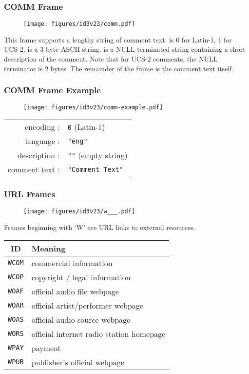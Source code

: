 \clearpage

\subsubsection{COMM Frame}
\begin{figure}[h]
\texttt{[image: figures/id3v23/comm.pdf]}
\end{figure}
\par
\noindent
This frame supports a lengthy string of comment text.
 is 0 for Latin-1, 1 for UCS-2.
 is a 3 byte ASCII string.
 is a NULL-terminated string
containing a short description of the comment.
Note that for UCS-2 comments, the NULL terminator is 2 bytes.
The remainder of the frame is the comment text itself.

\subsubsection{COMM Frame Example}
\begin{figure}[h]
  \texttt{[image: figures/id3v23/comm-example.pdf]}
\end{figure}
\begin{table}[h]
\begin{tabular}{rl}
encoding : & \texttt{0} (Latin-1) \\
language : & \texttt{"eng"} \\
description : & \texttt{""} (empty string) \\
comment text : & \texttt{"Comment Text"} \\
\end{tabular}
\end{table}

\clearpage

\subsubsection{URL Frames}
\begin{figure}[h]
\texttt{[image: figures/id3v23/w\_\_\_.pdf]}
\end{figure}
\par
\noindent
Frames beginning with `W' are URL links to external resources.
\par
\begin{table}[h]
\begin{tabular}{|c|l|}
\hline
ID & Meaning \\
\hline
\texttt{WCOM} & commercial information \\
\texttt{WCOP} & copyright / legal information \\
\texttt{WOAF} & official audio file webpage \\
\texttt{WOAR} & official artist/performer webpage \\
\texttt{WOAS} & official audio source webpage \\
\texttt{WORS} & official internet radio station homepage \\
\texttt{WPAY} & payment \\
\texttt{WPUB} & publisher's official webpage \\
\hline
\end{tabular}
\end{table}

